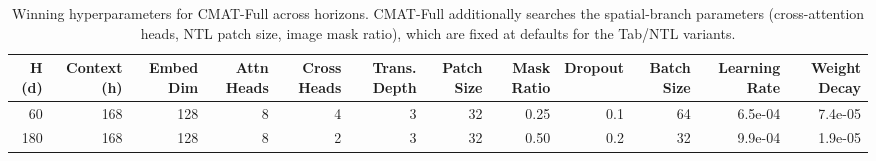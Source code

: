 \begin{table}[h]
\centering
\scriptsize
\caption{Winning hyperparameters for CMAT-Full across horizons. CMAT-Full
additionally searches the spatial-branch parameters (cross-attention heads,
NTL patch size, image mask ratio), which are fixed at defaults for the
Tab/NTL variants.}
\label{tab:hyperparams_full}
\begin{tabular}{r r r r r r r r r r r r}
\toprule
\textbf{H (d)} & \textbf{Context (h)} & \textbf{Embed Dim} & \textbf{Attn Heads} & \textbf{Cross Heads} & \textbf{Trans. Depth} &
\textbf{Patch Size} & \textbf{Mask Ratio} & \textbf{Dropout} & \textbf{Batch Size} & \textbf{Learning Rate} & \textbf{Weight Decay} \\
\midrule
60 & 168 & 128 & 8 & 4 & 3 & 32 & 0.25 & 0.1 & 64 & 6.5e-04 & 7.4e-05 \\
180 & 168 & 128 & 8 & 2 & 3 & 32 & 0.50 & 0.2 & 32 & 9.9e-04 & 1.9e-05 \\
\bottomrule
\end{tabular}
\end{table}

\clearpage
